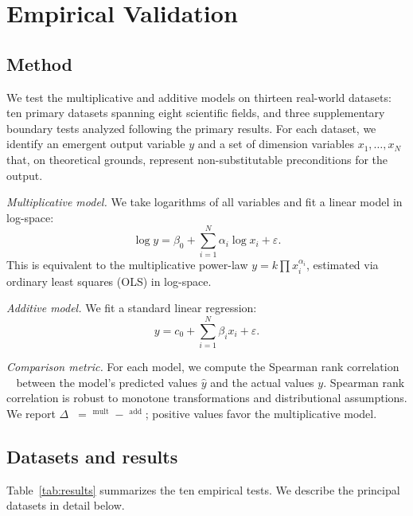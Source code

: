 \documentclass[12pt, a4paper]{article}
\theoremstyle{definition}
\theoremstyle{remark}
\DeclareMathOperator{\Spearman}{\rho_s}
\begin{document}
\section{Empirical Validation}\label{sec:empirical}

\subsection{Method}\label{sec:method}

We test the multiplicative and additive models on thirteen real-world datasets: ten primary datasets spanning eight scientific fields, and three supplementary boundary tests analyzed following the primary results. For each dataset, we identify an emergent output variable $y$ and a set of dimension variables $x_1, \ldots, x_N$ that, on theoretical grounds, represent non-substitutable preconditions for the output.

\textit{Multiplicative model.} We take logarithms of all variables and fit a linear model in log-space:
\begin{equation}\label{eq:logmodel}
\log y = \beta_0 + \sum_{i=1}^{N} \alpha_i \log x_i + \varepsilon.
\end{equation}
This is equivalent to the multiplicative power-law $y = k \prod x_i^{\alpha_i}$, estimated via ordinary least squares (OLS) in log-space.

\textit{Additive model.} We fit a standard linear regression:
\begin{equation}\label{eq:linmodel}
y = c_0 + \sum_{i=1}^{N} \beta_i x_i + \varepsilon.
\end{equation}

\textit{Comparison metric.} For each model, we compute the Spearman rank correlation $\Spearman$ between the model's predicted values $\hat{y}$ and the actual values $y$. Spearman rank correlation is robust to monotone transformations and distributional assumptions. We report $\Delta\Spearman = \Spearman^{\text{mult}} - \Spearman^{\text{add}}$; positive values favor the multiplicative model.

\subsection{Datasets and results}

Table~\ref{tab:results} summarizes the ten empirical tests. We describe the principal datasets in detail below.
\end{document}
